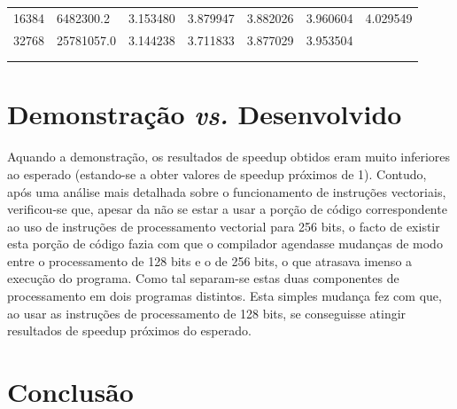 \documentclass[a4paper]{article}
\begin{document}
\begin{table}[h]
\begin{tabular}{lllllll}
16384                              & 6482300.2                              & 3.153480         & 3.879947          & 3.882026          & 3.960604          & 4.029549          \\
32768                              & 25781057.0                             & 3.144238         & 3.711833          & 3.877029          & 3.953504          &                   \\
                                   &                                        &                  &                   &                   &                   &                   \\
                                   &                                        &                  &                   &                   &                   &                  
\end{tabular}
\end{table}
	
	\section{Demonstração \textit{vs.} Desenvolvido}
	
	 Aquando a demonstração, os resultados de speedup obtidos eram muito inferiores ao esperado (estando-se a obter valores de speedup próximos de 1). Contudo, após uma análise mais detalhada sobre o funcionamento de instruções vectoriais, verificou-se que, apesar da não se estar a usar a porção de código correspondente ao uso de instruções de processamento vectorial para 256 bits, o facto de existir esta porção de código fazia com que o compilador agendasse mudanças de modo entre o processamento de 128 bits e o de 256 bits, o que atrasava imenso a execução do programa. Como tal separam-se estas duas componentes de processamento em dois programas distintos. Esta simples mudança fez com que, ao usar as instruções de processamento de 128 bits, se conseguisse atingir resultados de speedup próximos do esperado.
	   
	
	
	
	\section{Conclusão}
\end{document}
